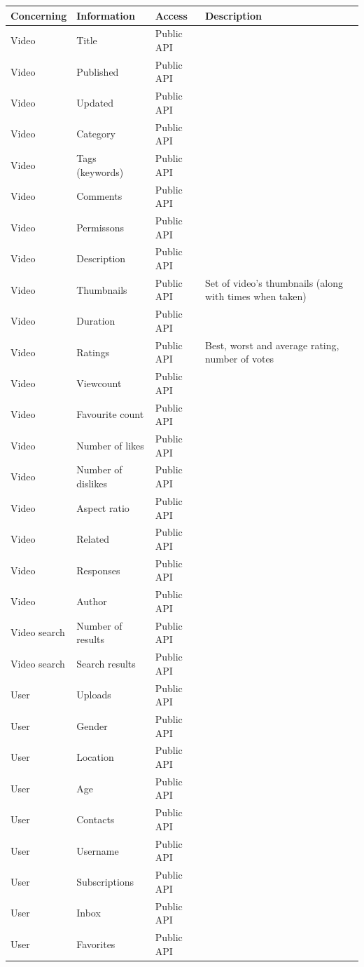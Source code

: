 \documentclass{article}
\begin{document}
\begin{tabular}{l p{3cm} l p{4cm}}
Concerning & Information & Access & Description\\ \hline
Video & Title & Public API \\
Video & Published & Public API \\
Video & Updated & Public API \\
Video & Category & Public API \\
Video & Tags (keywords) & Public API \\
Video & Comments & Public API \\
Video & Permissons & Public API \\
Video & Description & Public API \\
Video & Thumbnails & Public API & Set of video's thumbnails (along with times
when taken) \\
Video & Duration & Public API \\
Video & Ratings & Public API & Best, worst and average rating, number of votes
\\
Video & Viewcount & Public API \\
Video & Favourite count & Public API \\
Video & Number of likes & Public API \\
Video & Number of dislikes & Public API \\
Video & Aspect ratio & Public API \\
Video & Related & Public API \\
Video & Responses & Public API \\
Video & Author & Public API \\

Video search & Number of results & Public API \\
Video search & Search results & Public API \\

User & Uploads & Public API \\
User & Gender & Public API \\
User & Location & Public API \\
User & Age & Public API \\
User & Contacts & Public API \\
User & Username & Public API \\
User & Subscriptions & Public API \\
User & Inbox & Public API \\
User & Favorites & Public API \\


\end{tabular}
\end{document}
